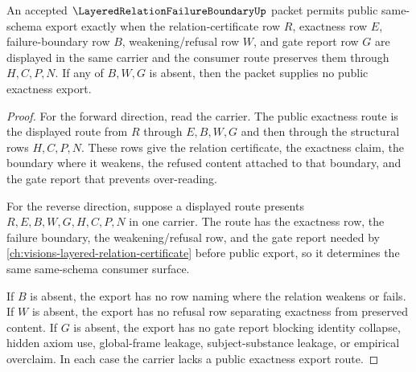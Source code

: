 \begin{theorem}
\label{thm:layered-relation-failure-boundary-gate-exactness}
An accepted $\LayeredRelationFailureBoundaryUp$ packet permits public same-schema export exactly when the relation-certificate row $R$, exactness row $E$, failure-boundary row $B$, weakening/refusal row $W$, and gate report row $G$ are displayed in the same carrier and the consumer route preserves them through $H,C,P,N$. If any of $B,W,G$ is absent, then the packet supplies no public exactness export.
\end{theorem}
\begin{proof}
For the forward direction, read the carrier. The public exactness route is the displayed route from $R$ through $E,B,W,G$ and then through the structural rows $H,C,P,N$. These rows give the relation certificate, the exactness claim, the boundary where it weakens, the refused content attached to that boundary, and the gate report that prevents over-reading.

For the reverse direction, suppose a displayed route presents $R,E,B,W,G,H,C,P,N$ in one carrier. The route has the exactness row, the failure boundary, the weakening/refusal row, and the gate report needed by \autoref{ch:visions-layered-relation-certificate} before public export, so it determines the same same-schema consumer surface.

If $B$ is absent, the export has no row naming where the relation weakens or fails. If $W$ is absent, the export has no refusal row separating exactness from preserved content. If $G$ is absent, the export has no gate report blocking identity collapse, hidden axiom use, global-frame leakage, subject-substance leakage, or empirical overclaim. In each case the carrier lacks a public exactness export route.
\end{proof}


